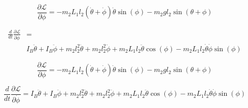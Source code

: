 \begin{equation}
\frac{\partial\mathcal{L}}{\partial\phi} = -m_{2}L_{1}l_{2}(\dot{\theta}+\dot{\phi})\dot{\theta}\sin(\phi)-m_{2}gl_{2}\sin(\theta+\phi)
\end{equation}

\begin{equation}
\begin{split}
\frac{d}{dt}\frac{\partial\mathcal{L}}{\partial\dot{\phi}} &= \\
&I_{B}\ddot{\theta}+I_{B}\ddot{\phi}+m_{2}l_{2}^2\ddot{\theta}+m_{2}l_{2}^2\ddot{\phi}+m_{2}L_{1}l_{2}\ddot{\theta}\cos(\phi)-m_{2}L_{1}l_{2}\dot{\theta}\dot{\phi}\sin(\phi)
\end{split}
\end{equation}

\begin{equation}
\frac{\partial\mathcal{L}}{\partial\phi} = -m_{2}L_{1}l_{2}(\dot{\theta}+\dot{\phi})\dot{\theta}\sin(\phi)-m_{2}gl_{2}\sin(\theta+\phi)
\end{equation}


\begin{equation}
\frac{d}{dt}\frac{\partial\mathcal{L}}{\partial\dot{\phi}}=I_{B}\ddot{\theta}+I_{B}\ddot{\phi}+m_{2}l_{2}^2\ddot{\theta}+m_{2}l_{2}^2\ddot{\phi}+m_{2}L_{1}l_{2}\ddot{\theta}\cos(\phi)-m_{2}L_{1}l_{2}\dot{\theta}\dot{\phi}\sin(\phi)
\end{equation}

